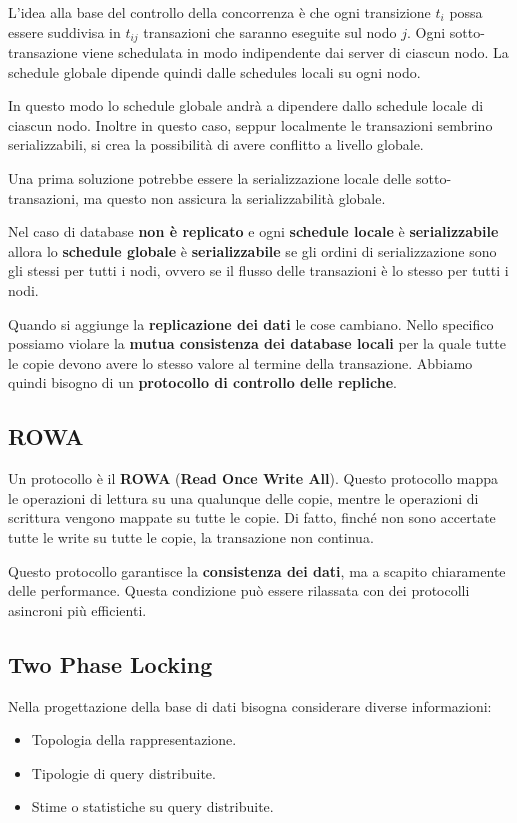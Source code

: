 L'idea alla base del controllo della concorrenza è che ogni transizione $t_i$
possa essere suddivisa in $t_{ij}$ transazioni che saranno eseguite sul nodo $j$.
Ogni sotto-transazione viene schedulata in modo indipendente dai server di
ciascun nodo. La schedule globale dipende quindi dalle schedules locali su ogni nodo.

In questo modo lo schedule globale andrà a dipendere dallo schedule locale di
ciascun nodo. Inoltre in questo caso, seppur localmente le transazioni sembrino
serializzabili, si crea la possibilità di avere conflitto a livello globale.

Una prima soluzione potrebbe essere la serializzazione locale delle sotto-transazioni,
ma questo non assicura la serializzabilità globale.

Nel caso di database \textbf{non è replicato} e ogni \textbf{schedule locale} è  \textbf{serializzabile}
allora lo  \textbf{schedule globale} è  \textbf{serializzabile} se gli ordini di serializzazione
sono gli stessi per tutti i nodi, ovvero se il flusso delle transazioni è lo
stesso per tutti i nodi.

Quando si aggiunge la  \textbf{replicazione dei dati} le cose cambiano. Nello specifico
possiamo violare la \textbf{mutua consistenza dei database locali} per la quale tutte le
copie devono avere lo stesso valore al termine della transazione. Abbiamo quindi
bisogno di un \textbf{protocollo di controllo delle repliche}.

\subsection{ROWA}
Un protocollo è il \textbf{ROWA} (\textbf{Read Once Write All}). Questo
protocollo mappa le operazioni di lettura su una qualunque delle copie, mentre
le operazioni di scrittura vengono mappate su tutte le copie. Di fatto, finché
non sono accertate tutte le write su tutte le copie, la transazione non continua.

Questo protocollo garantisce la \textbf{consistenza dei dati}, ma a scapito chiaramente delle
performance. Questa condizione può essere rilassata con dei protocolli asincroni
più efficienti.

\subsection{Two Phase Locking}
Nella progettazione della base di dati bisogna considerare diverse informazioni:
\begin{itemize}
    \item Topologia della rappresentazione.
    \item Tipologie di query distribuite.
    \item Stime o statistiche su query distribuite.
\end{itemize}

